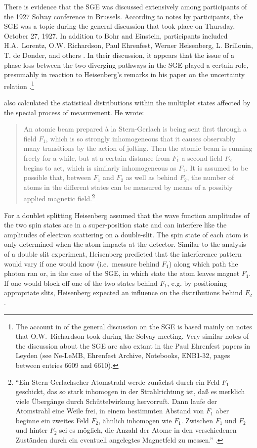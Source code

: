 \documentclass[12pt]{article}
\begin{document}
There is evidence that the SGE was discussed extensively among participants of the 1927 Solvay conference in Brussels. According to notes by participants, the SGE was a topic during the general discussion that took place on Thursday, October 27, 1927. In addition to Bohr and Einstein, participants included H.A.~Lorentz, O.W. Richardson, Paul Ehrenfest, Werner Heisenberg, L. Brillouin, T. de Donder, and others \cite[pp.~436, 478, 500]{BacciagaluppiGEtAl2009Crossroads}. In their discussion, it appears that the issue of a phase loss between the two diverging pathways in the SGE played a certain role, presumably in reaction  to Heisenberg's remarks in his paper on the uncertainty relation \citep{HeisenbergW1927Inhalt}.\footnote{The account in \citep{BacciagaluppiGEtAl2009Crossroads} of the general discussion on the SGE is based mainly on notes that O.W.~Richardson took during the Solvay meeting. Very similar notes of the discussion about the SGE are also extant in the Paul Ehrenfest papers in Leyden (see Ne-LeMB, Ehrenfest Archive, Notebooks, ENB1-32, pages between entries 6609 and 6610).}

\cite{HeisenbergW1927Inhalt} also calculated the statistical distributions within the multiplet states affected by the special process of measurement. He wrote:
\begin{quote}
An atomic beam prepared \`a la Stern-Gerlach is being sent first through a field $F_1$, which is so strongly inhomogeneous that it causes observably many transitions by the action of jolting. Then the atomic beam is running freely for a while, but at a certain distance from $F_1$ a second field $F_2$ begins to act, which is similarly inhomogeneous as $F_1$. It is assumed to be possible that, between $F_1$ and $F_2$ as well as behind $F_2$, the number of atoms in the different states can be measured by means of a possibly applied magnetic field.\footnote{``Ein Stern-Gerlachscher Atomstrahl werde zunächst durch ein Feld $F_1$ geschickt, das so stark inhomogen in der Strahlrichtung ist, da{\ss} es merklich viele Übergänge durch \glqq Schüttelwirkung{\grqq} hervorruft. Dann laufe der Atomstrahl eine Weile frei, in einem bestimmten Abstand von $F_1$ aber beginne ein zweites Feld $F_2$, ähnlich inhomogen wie $F_1$. Zwischen $F_1$ und $F_2$ und hinter $F_2$ sei es möglich, die Anzahl der Atome in den verschiedenen Zuständen durch ein eventuell angelegtes Magnetfeld zu messen.'' \cite[p.~182]{HeisenbergW1927Inhalt}.}
\end{quote}
For a doublet splitting Heisenberg assumed that the wave function amplitudes of the two spin states are in a super-position state and can interfere like the amplitudes of electron scattering on a double-slit. The spin state of each atom is only determined when the atom impacts at the detector. Similar to the analysis of a double slit experiment, Heisenberg predicted that the interference pattern would vary if one would know (i.e.\ measure behind $F_1$) along which path the photon ran or, in the case of the SGE, in which state the atom leaves magnet $F_1$. If one would block off one of the two states behind $F_1$, e.g. by positioning appropriate slits, Heisenberg expected an influence on the distributions behind $F_2$. 
\end{document}

